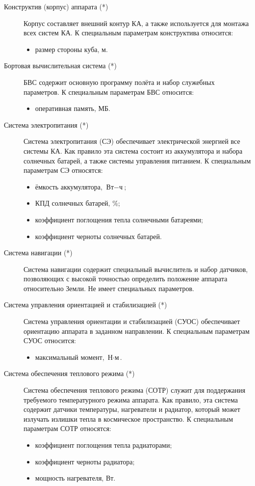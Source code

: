 \documentclass[12pt,a4paper]{article}
\begin{document}
\begin{description}
\item[Конструктив (корпус) аппарата (*)] Корпус составляет внешний контур КА, а также
  используется для монтажа всех систем КА. К специальным параметрам конструктива
  относится:
  \begin{itemize}
    \item размер стороны куба, м.
  \end{itemize}
\item[Бортовая вычислительная система (*)] БВС содержит основную программу полёта и набор
  служебных параметров. К специальным параметрам БВС относится:
  \begin{itemize}
    \item оперативная память, МБ.
  \end{itemize}
\item [Система электропитания (*)] Система электропитания (СЭ) обеспечивает электрической энергией
  все системы КА. Как правило эта система состоит из аккумулятора и набора солнечных
  батарей, а также системы управления питанием. К специальным параметрам СЭ относятся:
  \begin{itemize}
  \item ёмкость аккумулятора, $\text{Вт} - \text{ч}$;
  \item КПД солнечных батарей, \%;
  \item коэффициент поглощения тепла солнечными батареями;
  \item коэффициент черноты солнечных батарей.
  \end{itemize}

\item [Система навигации (*)] Система навигации содержит специальный вычислитель и набор
  датчиков, позволяющих с высокой точностью определить положение аппарата относительно
  Земли. Не имеет специальных параметров.

\item [Система управления ориентацией и стабилизацией (*)] Система управления ориентации и
  стабилизацией (СУОС) обеспечивает ориентацию аппарата в заданном направлении. К
  специальным параметрам СУОС относится:
  \begin{itemize}
    \item максимальный момент, $\text{Н} \cdot \text{м}$.
  \end{itemize}

\item [Система обеспечения теплового режима (*)] Система обеспечения теплового
  режима (СОТР) служит для поддержания требуемого температурного режима аппарата. Как правило,
  эта система содержит датчики температуры, нагреватели и радиатор, который может излучать
  излишки тепла в космическое пространство. К специальным параметрам СОТР относятся:
  \begin{itemize}
  \item коэффициент поглощения тепла радиаторами;
  \item коэффициент черноты радиатора;
  \item мощность нагревателя, Вт.
  \end{itemize}


\end{description}
\end{document}
